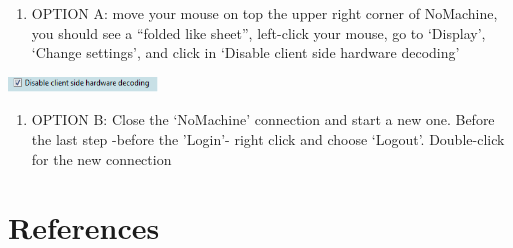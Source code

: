 \documentclass[]{book}
\providecommand{\tightlist}{%
  \setlength{\itemsep}{0pt}\setlength{\parskip}{0pt}}
\begin{document}
\begin{enumerate}
\def\labelenumi{\arabic{enumi}.}
\setcounter{enumi}{4}
\tightlist
\item
  {OPTION A}: move your mouse on top the upper right
  corner of NoMachine, you should see a ``folded like sheet'',
  left-click your mouse, go to `Display', `Change settings', and click
  in `Disable client side hardware decoding'
\end{enumerate}

\includegraphics[width=1.56522in,height=0.15in]{./media/image48.png}

\begin{enumerate}
\def\labelenumi{\arabic{enumi}.}
\setcounter{enumi}{5}
\tightlist
\item
  {OPTION B}: Close the `NoMachine' connection and start a
  new one. Before the last step -before the 'Login'- right click and
  choose `Logout'. Double-click for the new connection
\end{enumerate}

\hypertarget{references}{%
\chapter{References}\label{references}}


\end{document}
